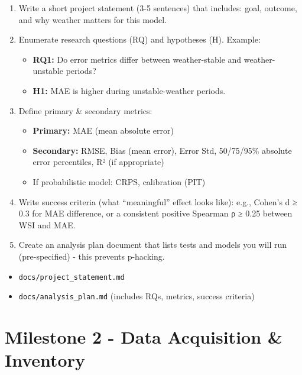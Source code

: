 \documentclass[11pt,a4paper]{article}
\begin{document}
\begin{enumerate}[label=\arabic*.]
    \item Write a short project statement (3-5 sentences) that includes: goal, outcome, and why weather matters for this model.
    
    \item Enumerate research questions (RQ) and hypotheses (H). Example:
    \begin{itemize}
        \item \textbf{RQ1:} Do error metrics differ between weather-stable and weather-unstable periods?
        \item \textbf{H1:} MAE is higher during unstable-weather periods.
    \end{itemize}
    
    \item Define primary \& secondary metrics:
    \begin{itemize}
        \item \textbf{Primary:} MAE (mean absolute error)
        \item \textbf{Secondary:} RMSE, Bias (mean error), Error Std, 50/75/95\% absolute error percentiles, R² (if appropriate)
        \item If probabilistic model: CRPS, calibration (PIT)
    \end{itemize}
    
    \item Write success criteria (what ``meaningful'' effect looks like): e.g., Cohen's d ≥ 0.3 for MAE difference, or a consistent positive Spearman ρ ≥ 0.25 between WSI and MAE.
    
    \item Create an analysis plan document that lists tests and models you will run (pre-specified) - this prevents p-hacking.
\end{enumerate}

\begin{deliverablebox}
\begin{itemize}
    \item \texttt{docs/project\_statement.md}
    \item \texttt{docs/analysis\_plan.md} (includes RQs, metrics, success criteria)
\end{itemize}
\end{deliverablebox}

\section{Milestone 2 - Data Acquisition \& Inventory}
\end{document}
